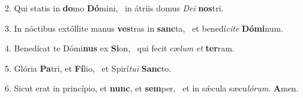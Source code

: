 2. Qui statis in \textbf{do}mo \textbf{Dó}mini, \ast\  in átriis domus \textit{De}\textit{i} \textbf{nos}tri.\

3. In nóctibus extóllite manus \textbf{ves}tras in \textbf{sanc}ta, \ast\  et benedí\textit{ci}\textit{te} \textbf{Dó}\textbf{mi}num.\

4. Benedícat te Dómi\textbf{nus} ex \textbf{Si}on, \ast\  qui fecit cæ\textit{lum} \textit{et} \textbf{ter}ram.\

5. Glória \textbf{Pa}tri, et \textbf{Fí}lio, \ast\  et Spirí\textit{tu}\textit{i} \textbf{Sanc}to.\

6. Sicut erat in princípio, et \textbf{nunc}, et \textbf{sem}per, \ast\  et in sǽcula sæcu\textit{ló}\textit{rum}. \textbf{A}men.\


